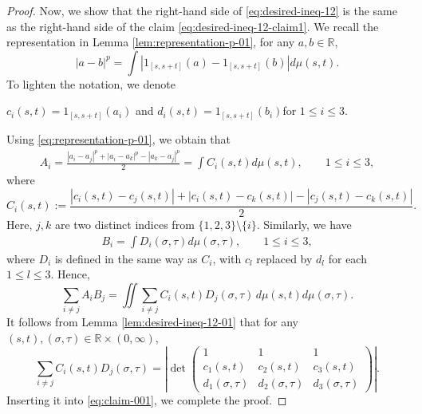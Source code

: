 \documentclass[11pt,a4paper]{amsart}
\theoremstyle{plain}
\theoremstyle{definition}
\newcommand{\R}{\mathbb R}
\begin{document}
\begin{proof}
    Now, we show that the right-hand side of \eqref{eq:desired-ineq-12} is the same as the right-hand side of the claim \eqref{eq:desired-ineq-12-claim1}.
    We recall the representation in Lemma \ref{lem:representation-p-01}, for any $ a,b \in \R$,
    \begin{equation} \label{eq:representation-p-01}
        |a-b|^p=\int \left|{1}_{[s, s+t]}(a)-{1}_{[s, s+t]}(b)\right| d \mu(s,t).
    \end{equation}
    To lighten the notation, we denote 
    \begin{center}
        $c_i (s,t) = {1}_{[s, s+t]}(a_i)$ \quad and \quad  $d_i(s,t) = {1}_{[s, s+t]}(b_i)$\qquad for $ 1\leq i \leq 3$.
    \end{center} 
    Using \eqref{eq:representation-p-01}, we obtain that 
    \begin{align}
        A_i = \frac{|a_i - a_j|^p + |a_i - a_k|^p - |a_k - a_j|^p}{2} =
        \int C_i(s,t)  d \mu(s,t), \qquad  1\leq i \leq 3,
    \end{align}
    where 
    \[
        C_i(s,t) :=  \frac{|c_i (s,t)- c_j(s,t)| + |c_i (s,t)- c_k(s,t)| - |c_j(s,t) - c_k(s,t)|}{2}.
    \]
    Here, $j,k$ are two distinct  indices from $\{1,2,3\} \setminus \{i\}$.
    Similarly, we have
    \begin{align}
        B_i =\int D_i(\sigma, \tau)  d \mu(\sigma,\tau), \qquad  1\leq i \leq 3,
    \end{align}
    where $D_i$ is defined in the same way as $C_i$, with $c_l$ replaced by $d_l$ for each $1 \leq l\leq 3$.
    Hence,
    \begin{equation} \label{eq:claim-001}
        \sum_{i \neq j} A_i B_j  =  \iint \sum_{i \neq j} C_i (s, t) D_j(\sigma, \tau) \, d \mu(s,t)   d \mu(\sigma,\tau).
    \end{equation}
    It follows from Lemma \ref{lem:desired-ineq-12-01} that for any $(s,t) ,(\sigma,\tau) \in \R\times (0,\infty)$,
    \begin{equation} \label{eq:claim-p-01}
        \sum_{i \neq j} C_i(s, t) D_j(\sigma, \tau)
        = 
        \left|\operatorname{det}\left(\begin{array}{ccc}1 & 1 & 1 \\ c_1(s,t) & c_2(s,t) & c_3(s,t) \\ d_1(\sigma, \tau) & d_2(\sigma, \tau) & d_3(\sigma, \tau)\end{array}\right)\right|.
    \end{equation}
    Inserting it into \eqref{eq:claim-001}, we complete the proof. \qedhere
\end{proof}
\end{document}
